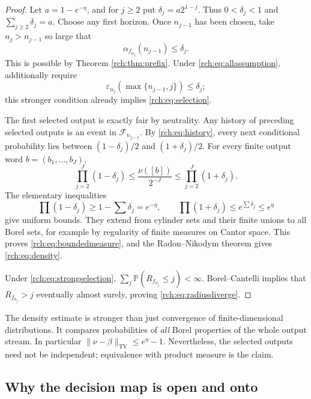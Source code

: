 \documentclass[11pt]{article}
\theoremstyle{definition}
\theoremstyle{remark}
\newcommand{\Prb}{\mathbb P}
\newcommand{\cF}{\mathcal F}
\newcommand{\eps}{\varepsilon}
\newcommand{\TV}{\operatorname{TV}}
\begin{document}
\begin{proof}
Let \(a=1-e^{-\eta}\), and for \(j\ge2\) put
\(\delta_j=a2^{1-j}\). Thus \(0<\delta_j<1\) and
\(\sum_{j\ge2}\delta_j=a\). Choose any first horizon. Once \(n_{j-1}\)
has been chosen, take \(n_j>n_{j-1}\) so large that
\begin{equation}
 \alpha_{f_{n_j}}(n_{j-1})\le\delta_j.
 \label{rch:eq:selection}
\end{equation}
This is possible by Theorem \ref{rch:thm:prefix}. Under
\eqref{rch:eq:allassumption}, additionally require
\begin{equation}
 \eps_{n_j}(\max\{n_{j-1},j\})\le\delta_j;
 \label{rch:eq:strongselection}
\end{equation}
this stronger condition already implies \eqref{rch:eq:selection}.

The first selected output is exactly fair by neutrality. Any history of
preceding selected outputs is an event in \(\cF_{n_{j-1}}\). By
\eqref{rch:eq:history}, every next conditional probability lies between
\((1-\delta_j)/2\) and \((1+\delta_j)/2\). For every finite output word
\(b=(b_1,\ldots,b_J)\),
\begin{equation}
 \prod_{j=2}^{J}(1-\delta_j)
 \le\frac{\nu([b])}{2^{-J}}
 \le\prod_{j=2}^{J}(1+\delta_j).
 \label{rch:eq:cylinderdensity}
\end{equation}
The elementary inequalities
\[
 \prod(1-\delta_j)\ge1-\sum\delta_j=e^{-\eta},
 \qquad
 \prod(1+\delta_j)\le e^{\sum\delta_j}\le e^\eta
\]
give uniform bounds. They extend from cylinder sets and their finite unions
to all Borel sets, for example by regularity of finite measures on Cantor space.
This proves \eqref{rch:eq:boundedmeasure}, and the Radon--Nikodym theorem gives
\eqref{rch:eq:density}.

Under \eqref{rch:eq:strongselection},
\(\sum_j\Prb(R_{f_{n_j}}\le j)<\infty\). Borel--Cantelli implies that
\(R_{f_{n_j}}>j\) eventually almost surely, proving \eqref{rch:eq:radiusdiverge}.
\end{proof}

The density estimate is stronger than just convergence of finite-dimensional
distributions. It compares probabilities of \emph{all} Borel properties of the
whole output stream. In particular
\(\|\nu-\beta\|_{\TV}\le e^\eta-1\). Nevertheless, the selected outputs
need not be independent; equivalence with product measure is the claim.

\subsection{Why the decision map is open and onto}
\end{document}
